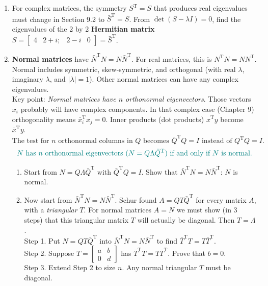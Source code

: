 \documentclass[14pt, a4paper]{article}
\begin{document}
\begin{enumerate}[resume]
    \item For complex matrices, the symmetry $S^{\mathrm{T}} = S$ that produces real eigenvalues must change in Section 9.2 to $\bar{S}^{\mathrm{T}} = S$. From $\det(S - \lambda I) = 0$, find the eigenvalues of the 2 by 2 \textbf{Hermitian matrix} $S = \begin{bmatrix} 4 & 2 + i; & 2 - i & 0 \end{bmatrix} = \bar{S}^{\mathrm{T}}$.

    \item \textbf{Normal matrices} have $\bar{N}^{\mathrm{T}}N = N\bar{N}^{\mathrm{T}}$. For real matrices, this is $N^{\mathrm{T}}N = NN^{\mathrm{T}}$. Normal includes symmetric, skew-symmetric, and orthogonal (with real $\lambda$, imaginary $\lambda$, and $|\lambda| = 1$). Other normal matrices can have any complex eigenvalues. \\
          Key point: \textit{Normal matrices have $n$ orthonormal eigenvectors}. Those vectors $x_i$ probably will have complex components. In that complex case (Chapter 9) orthogonality means $\bar{x}_i^{\mathrm{T}}x_j = 0$. Inner products (dot products) $x^{\mathrm{T}}y$ become $\bar{x}^{\mathrm{T}}y$.
          $$
              \text{The test for } n \text{ orthonormal columns in } Q \text{ becomes } \bar{Q}^{\mathrm{T}}Q = I \text{ instead of } Q^{\mathrm{T}}Q = I.
          $$
          \[
              \textcolor{blue!50!green}{N \text{ has } n \text{ orthonormal eigenvectors } (N = Q\Lambda\bar{Q}^{\mathrm{T}}) \text{ if and only if } N \text{ is normal.}}
          \]
          \begin{enumerate}
              \item Start from $N = Q\Lambda\bar{Q}^{\mathrm{T}}$ with $\bar{Q}^{\mathrm{T}}Q = I$. Show that $\bar{N}^{\mathrm{T}}N = N\bar{N}^{\mathrm{T}}$: $N$ is normal.
              \item Now start from $\bar{N}^{\mathrm{T}}N = N\bar{N}^{\mathrm{T}}$. Schur found $A = QT\bar{Q}^{\mathrm{T}}$ for every matrix $A$, with a \textit{triangular} $T$. For normal matrices $A = N$ we must show (in 3 steps) that this triangular matrix $T$ will actually be diagonal. Then $T = \Lambda$. \\
                    Step 1. Put $N = QT\bar{Q}^{\mathrm{T}}$ into $\bar{N}^{\mathrm{T}}N = N\bar{N}^{\mathrm{T}}$ to find $\bar{T}^{\mathrm{T}}T = T\bar{T}^{\mathrm{T}}$. \\
                    Step 2. Suppose $T = \begin{bmatrix} a & b \\ 0 & d \end{bmatrix}$ has $\bar{T}^{\mathrm{T}}T = T\bar{T}^{\mathrm{T}}$. Prove that $b = 0$. \\
                    Step 3. Extend Step 2 to size $n$. Any normal triangular $T$ must be diagonal.
          \end{enumerate}


\end{enumerate}
\end{document}
